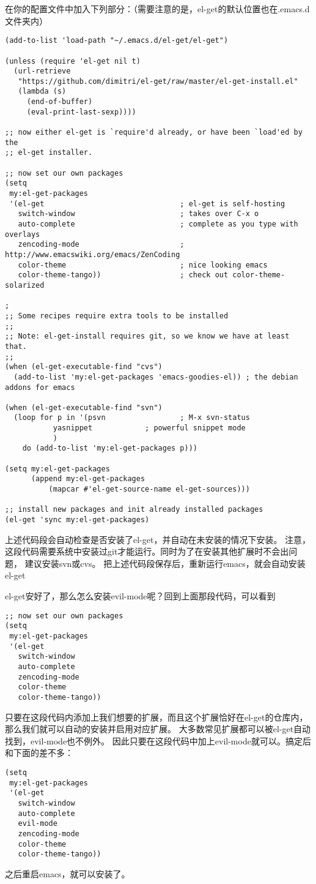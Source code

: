 \documentclass{article}
\begin{document}
在你的配置文件中加入下列部分：（需要注意的是，el-get的默认位置也在.emacs.d文件夹内）
\begin{verbatim}
(add-to-list 'load-path "~/.emacs.d/el-get/el-get")

(unless (require 'el-get nil t)
  (url-retrieve
   "https://github.com/dimitri/el-get/raw/master/el-get-install.el"
   (lambda (s)
     (end-of-buffer)
     (eval-print-last-sexp))))

;; now either el-get is `require'd already, or have been `load'ed by the
;; el-get installer.

;; now set our own packages
(setq
 my:el-get-packages
 '(el-get                               ; el-get is self-hosting
   switch-window                        ; takes over C-x o
   auto-complete                        ; complete as you type with overlays
   zencoding-mode                       ; http://www.emacswiki.org/emacs/ZenCoding
   color-theme                          ; nice looking emacs
   color-theme-tango))                  ; check out color-theme-solarized

;
;; Some recipes require extra tools to be installed
;;
;; Note: el-get-install requires git, so we know we have at least that.
;;
(when (el-get-executable-find "cvs")
  (add-to-list 'my:el-get-packages 'emacs-goodies-el)) ; the debian addons for emacs

(when (el-get-executable-find "svn")
  (loop for p in '(psvn                 ; M-x svn-status
		   yasnippet            ; powerful snippet mode
		   )
	do (add-to-list 'my:el-get-packages p)))

(setq my:el-get-packages
      (append my:el-get-packages
	      (mapcar #'el-get-source-name el-get-sources)))

;; install new packages and init already installed packages
(el-get 'sync my:el-get-packages)
\end{verbatim}
上述代码段会自动检查是否安装了el-get，并自动在未安装的情况下安装。
注意，这段代码需要系统中安装过git才能运行。同时为了在安装其他扩展时不会出问题，
建议安装svn或cvs。
把上述代码段保存后，重新运行emacs，就会自动安装el-get

el-get安好了，那么怎么安装evil-mode呢？回到上面那段代码，可以看到
\begin{verbatim}
;; now set our own packages
(setq
 my:el-get-packages
 '(el-get                               
   switch-window                        
   auto-complete                        
   zencoding-mode                       
   color-theme                          
   color-theme-tango))
\end{verbatim}
只要在这段代码内添加上我们想要的扩展，而且这个扩展恰好在el-get的仓库内，
那么我们就可以自动的安装并启用对应扩展。
大多数常见扩展都可以被el-get自动找到，evil-mode也不例外。
因此只要在这段代码中加上evil-mode就可以。搞定后和下面的差不多：
\begin{verbatim}
(setq
 my:el-get-packages
 '(el-get                               
   switch-window                        
   auto-complete                        
   evil-mode
   zencoding-mode                       
   color-theme                          
   color-theme-tango))
\end{verbatim}
之后重启emacs，就可以安装了。
\end{document}
